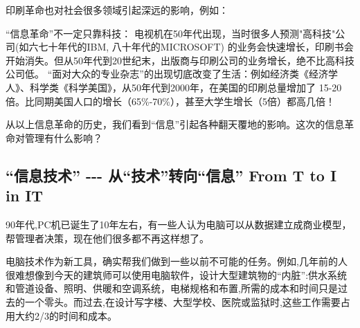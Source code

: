 印刷革命也对社会很多领域引起深远的影响，例如：


``信息革命''不一定只靠科技：
电视机在50年代出现，当时很多人预测"高科技"公司(如六七十年代的IBM,
八十年代的MICROSOFT)
的业务会快速增长，印刷书会开始消失。但从50年代到20世纪末，出版商与印刷公司的业务增长，绝不比高科技公司低。
``面对大众的专业杂志''的出现切底改变了生活：例如经济类《经济学人》、科学类《科学美国》，从50年代到2000年，在美国的印刷总量增加了
15-20
倍。比同期美国人口的增长（65\%-70\%），甚至大学生增长（5倍）都高几倍！

从以上信息革命的历史，我们看到``信息''引起各种翻天覆地的影响。这次的信息革命对管理有什么影响？

\hypertarget{ux4fe1ux606fux6280ux672f-----ux4eceux6280ux672fux8f6cux5411ux4fe1ux606f-from-t-to-i-in-it}{%
\subsection{``信息技术'' -\/-\/- 从``技术''转向``信息'' From T to I in
IT}\label{ux4fe1ux606fux6280ux672f-----ux4eceux6280ux672fux8f6cux5411ux4fe1ux606f-from-t-to-i-in-it}}

90年代,PC机已诞生了10年左右，有一些人认为电脑可以从数据建立成商业模型，帮管理者决策，现在他们很多都不再这样想了。

电脑技术作为新工具，确实帮我们做到一些以前不可能的任务。例如,几年前的人很难想像到今天的建筑师可以使用电脑软件，设计大型建筑物的``内脏'':供水系统和管道设备、照明、供暖和空调系统，电梯规格和布置,所需的成本和时间只是过去的一个零头。而过去,在设计写字楼、大型学校、医院或监狱时,这些工作需要占用大约2/3的时间和成本。

